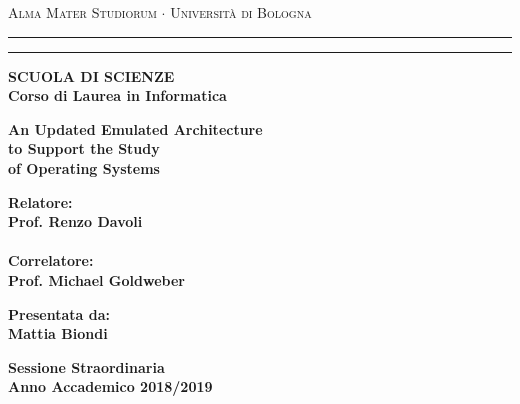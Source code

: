 \documentclass[12pt,a4paper,openright,twoside]{report}
\begin{document}
\begin{titlepage}
\begin{center}
{{\Large{\textsc{Alma Mater Studiorum $\cdot$ Università di
Bologna}}}} \rule[0.1cm]{15.8cm}{0.1mm}
\rule[0.5cm]{15.8cm}{0.6mm}
{\small{\bf SCUOLA DI SCIENZE\\
Corso di Laurea in Informatica }}
\end{center}
\vspace{15mm}
\begin{center}
{\LARGE{\bf An Updated Emulated Architecture}}\\
\vspace{3mm}
{\LARGE{\bf to Support the Study}}\\
\vspace{3mm}
{\LARGE{\bf of Operating Systems}}\\
\end{center}
\vspace{40mm}
\par
\noindent
\begin{minipage}[t]{0.47\textwidth}
{\large{\bf Relatore:\\
Prof. Renzo Davoli\\\\
Correlatore:\\
Prof. Michael Goldweber}}
\end{minipage}
\hfill
\begin{minipage}[t]{0.47\textwidth}\raggedleft
{\large{\bf Presentata da:\\
Mattia Biondi}}
\end{minipage}
\vspace{20mm}
\begin{center}
{\large{\bf Sessione Straordinaria\\
Anno Accademico 2018/2019}}
\end{center}
\end{titlepage}
\end{document}
